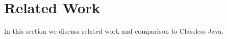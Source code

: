 \section{Related Work}\label{sec:related}
In this section we discuss related work and comparison to Classless Java.






